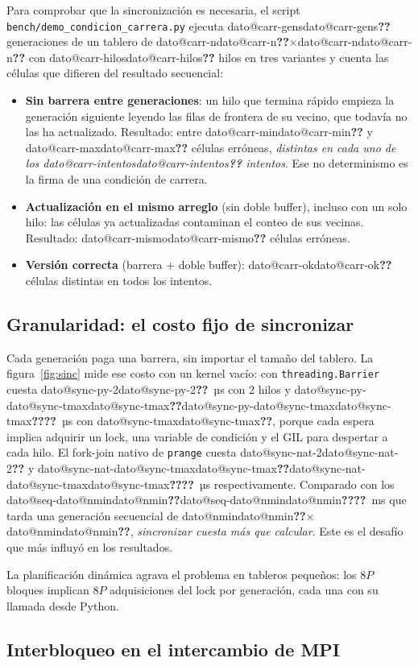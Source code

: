 \documentclass[11pt,a4paper]{article}
\makeatletter
\newcommand{\dato}[1]{\ifcsname dato@#1\endcsname\csname dato@#1\endcsname\else\textbf{\color{red}??}\fi}
\newcommand{\x}{$\times$}
\newcommand{\code}[1]{\texttt{#1}}
\makeatother
\begin{document}
Para comprobar que la sincronización es necesaria, el script \code{bench/demo\_condicion\_carrera.py} ejecuta
\dato{carr-gens} generaciones de un tablero de \dato{carr-n}\x\dato{carr-n} con \dato{carr-hilos} hilos en tres variantes
y cuenta las células que difieren del resultado secuencial:

\begin{itemize}
  \item \textbf{Sin barrera entre generaciones}: un hilo que termina rápido empieza la generación siguiente
        leyendo las filas de frontera de su vecino, que todavía no las ha actualizado. Resultado: entre
        \dato{carr-min} y \dato{carr-max} células erróneas, \emph{distintas en cada uno de los \dato{carr-intentos}
        intentos}. Ese no determinismo es la firma de una condición de carrera.
  \item \textbf{Actualización en el mismo arreglo} (sin doble buffer), incluso con un solo hilo: las células
        ya actualizadas contaminan el conteo de sus vecinas. Resultado: \dato{carr-mismo} células erróneas.
  \item \textbf{Versión correcta} (barrera + doble buffer): \dato{carr-ok} células distintas en todos los intentos.
\end{itemize}

\subsection{Granularidad: el costo fijo de sincronizar}

Cada generación paga una barrera, sin importar el tamaño del tablero. La figura~\ref{fig:sinc} mide ese costo con
un kernel vacío: con \code{threading.Barrier} cuesta \dato{sync-py-2}~µs con 2 hilos y \dato{sync-py-\dato{sync-tmax}}~µs
con \dato{sync-tmax}, porque cada espera implica adquirir un lock, una variable de condición y el GIL para
despertar a cada hilo. El fork-join nativo de \code{prange} cuesta \dato{sync-nat-2} y
\dato{sync-nat-\dato{sync-tmax}}~µs respectivamente. Comparado con los \dato{seq-\dato{nmin}}~ms que tarda
una generación secuencial de \dato{nmin}\x\dato{nmin}, \emph{sincronizar cuesta más que calcular}. Este es el
desafío que más influyó en los resultados.

La planificación dinámica agrava el problema en tableros pequeños: los $8P$ bloques implican $8P$ adquisiciones
del lock por generación, cada una con su llamada desde Python.

\subsection{Interbloqueo en el intercambio de MPI}\label{sec:deadlock}
\end{document}
